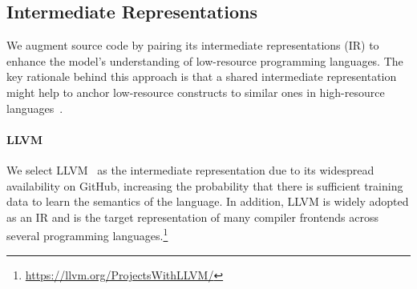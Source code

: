 \documentclass[10pt]{article} %
\begin{document}


\subsection{Intermediate Representations}\label{sec:source_irs}
We augment source code by pairing its intermediate representations (IR) to enhance the model's understanding of low-resource programming languages.
The key rationale behind this approach is that a shared intermediate representation might help to anchor low-resource constructs to similar ones in high-resource languages~\citep{zhuo2023data}. 



\paragraph{LLVM} We select LLVM~\citep{lattner2004llvm} as the intermediate representation due to its widespread availability on GitHub, increasing the probability that there is sufficient training data to learn the semantics of the language. In addition, LLVM is widely adopted as an IR and is the target representation of many compiler frontends across several programming languages.\footnote{\url{https://llvm.org/ProjectsWithLLVM/}}
\end{document}
